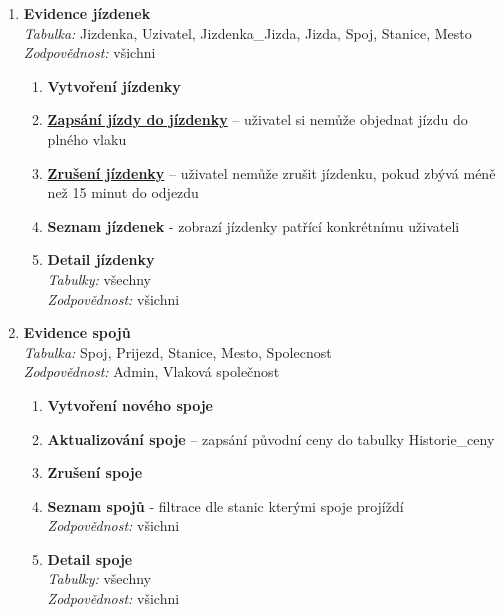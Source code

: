 \documentclass[11pt]{article}
\begin{document}
\begin{enumerate}
    \item \textbf{Evidence jízdenek}\\
        \textit{Tabulka:} Jizdenka, Uzivatel, Jizdenka\_Jizda, Jizda, Spoj, Stanice, Mesto\\
        \textit{Zodpovědnost:} všichni
        \begin{enumerate}
            \item \textbf{Vytvoření jízdenky}
            \item \underline{\textbf{Zapsání jízdy do jízdenky}} – uživatel si nemůže objednat jízdu do plného vlaku
            \item \underline{\textbf{Zrušení jízdenky}} – uživatel nemůže zrušit jízdenku, pokud zbývá méně než 15 minut do odjezdu
            \item \textbf{Seznam jízdenek} - zobrazí jízdenky patřící konkrétnímu uživateli
            \item \textbf{Detail jízdenky}\\
            \textit{Tabulky:} všechny\\
            \textit{Zodpovědnost:} všichni
        \end{enumerate}
        
\newpage

    \item \textbf{Evidence spojů}\\
        \textit{Tabulka:} Spoj, Prijezd, Stanice, Mesto, Spolecnost\\
        \textit{Zodpovědnost:} Admin, Vlaková společnost
        \begin{enumerate}
            \item \textbf{Vytvoření nového spoje}
            \item \textbf{Aktualizování spoje} – zapsání původní ceny do tabulky Historie\_ceny
            \item \textbf{Zrušení spoje}
            \item \textbf{Seznam spojů} - filtrace dle stanic kterými spoje projíždí\\
            \textit{Zodpovědnost:} všichni
            \item \textbf{Detail spoje}\\
            \textit{Tabulky:} všechny\\
            \textit{Zodpovědnost:} všichni
        \end{enumerate}


\end{enumerate}
\end{document}
